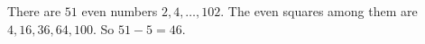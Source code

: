 There are $51$ even numbers $2,4,\dots,102$. The even squares among them are $4,16,36,64,100$. So $51-5=\boxed{46}$.
